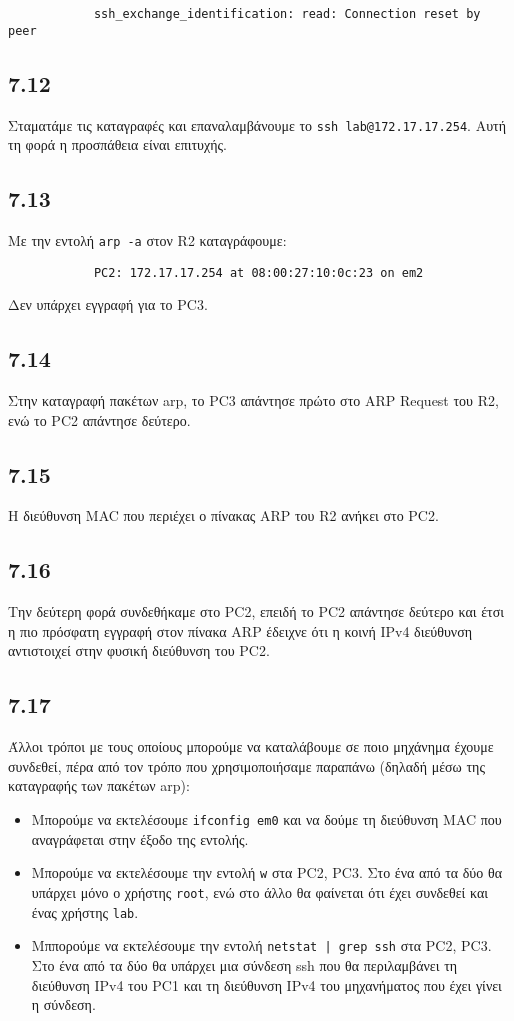 \documentclass[a4paper, 12pt]{article}
\begin{document}
		\begin{verbatim}
			ssh_exchange_identification: read: Connection reset by peer
		\end{verbatim}

	\subsection*{7.12}
		Σταματάμε τις καταγραφές και επαναλαμβάνουμε το \verb|ssh lab@172.17.17.254|. Αυτή τη φορά η προσπάθεια είναι επιτυχής.

	\subsection*{7.13}
		Με την εντολή \verb|arp -a| στον R2 καταγράφουμε:
		
		\begin{verbatim}
			PC2: 172.17.17.254 at 08:00:27:10:0c:23 on em2
		\end{verbatim}
		
		Δεν υπάρχει εγγραφή για το PC3.

	\subsection*{7.14}
		Στην καταγραφή πακέτων arp, το PC3 απάντησε πρώτο στο ARP Request του R2, ενώ το PC2 απάντησε δεύτερο. 

	\subsection*{7.15}
		Η διεύθυνση MAC που περιέχει ο πίνακας ARP του R2 ανήκει στο PC2.

	\subsection*{7.16}
		Την δεύτερη φορά συνδεθήκαμε στο PC2, επειδή το PC2 απάντησε δεύτερο και έτσι η πιο πρόσφατη εγγραφή στον πίνακα ARP έδειχνε ότι η κοινή IPv4 διεύθυνση αντιστοιχεί στην φυσική διεύθυνση του PC2.

	\subsection*{7.17}
		Άλλοι τρόποι με τους οποίους μπορούμε να καταλάβουμε σε ποιο μηχάνημα έχουμε συνδεθεί, πέρα από τον τρόπο που χρησιμοποιήσαμε παραπάνω (δηλαδή μέσω της καταγραφής των πακέτων arp):
		
		\begin{itemize}
			\item Μπορούμε να εκτελέσουμε \verb|ifconfig em0| και να δούμε τη διεύθυνση MAC που αναγράφεται στην έξοδο της εντολής.
			\item Μπορούμε να εκτελέσουμε την εντολή \verb|w| στα PC2, PC3. Στο ένα από τα δύο θα υπάρχει μόνο ο χρήστης \verb|root|, ενώ στο άλλο θα φαίνεται ότι έχει συνδεθεί και ένας χρήστης \verb|lab|.
			\item Μππορούμε να εκτελέσουμε την εντολή \verb+netstat | grep ssh+ στα PC2, PC3. Στο ένα από τα δύο θα υπάρχει μια σύνδεση ssh που θα περιλαμβάνει τη διεύθυνση IPv4 του PC1 και τη διεύθυνση IPv4 του μηχανήματος που έχει γίνει η σύνδεση.
		\end{itemize}
\end{document}
